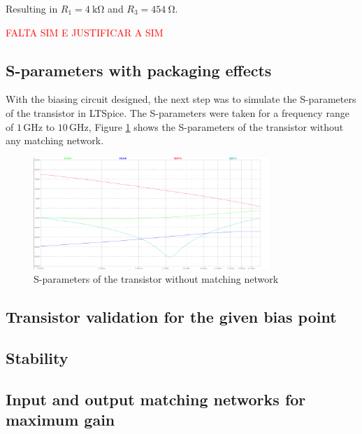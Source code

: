 Resulting in $R_1 = \SI{4}{\kilo\ohm}$ and $R_3 = \SI{454}{\ohm}$.

\textcolor{red}{FALTA SIM E JUSTIFICAR A SIM}

\subsection{S-parameters with packaging effects}

With the biasing circuit designed, the next step was to simulate the S-parameters of the transistor in LTSpice.  The S-parameters were taken for a frequency range of $1\,\si{\giga\hertz}$ to $10\,\si{\giga\hertz}$, Figure \ref{fig:withoutmathing} shows the S-parameters of the transistor without any matching network.

\begin{figure}[H]
    \centering
    \includegraphics[width=0.8\textwidth]{Images/without-matching.png}
    \caption{S-parameters of the transistor without matching network}
    \label{fig:withoutmathing}
\end{figure}

\subsection{Transistor validation for the given bias point}


\subsection{Stability}

\subsection{Input and output matching networks for maximum gain}

